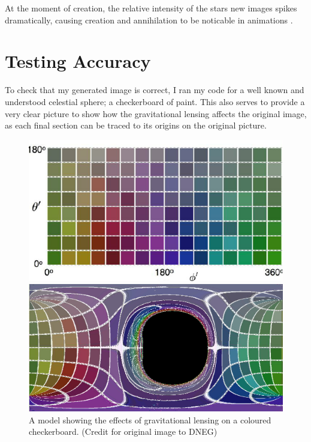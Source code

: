 \documentclass[oneside,openright,frontopenright, singlespacing]{dmathesis}
\begin{document}
\vspace{1em}
	At the moment of creation, the relative intensity of the stars new images spikes dramatically, causing creation and annihilation to be noticable in animations \cite{}.

\section{Testing Accuracy}

	To check that my generated image is correct, I ran my code for a well known and understood celestial sphere; a checkerboard of paint. This also serves to provide a very clear picture to show how the gravitational lensing affects the original image, as each final section can be traced to its origins on the original picture.

\vspace{1em}
	\begin{figure}[!ht]
	\centering
	\begin{minipage}{0.5\textwidth}
		\centering
		\includegraphics[width=0.8\linewidth]{img/checkerboard}
	\end{minipage}%
	\hfill
	\begin{minipage}{0.5\textwidth}
		\centering
		\includegraphics[width=0.8\linewidth]{img/checkerboard-kerr}
	\end{minipage}
	\caption{A model showing the effects of gravitational lensing on a coloured checkerboard. (Credit for original image to DNEG)}
\end{figure}
\end{document}
